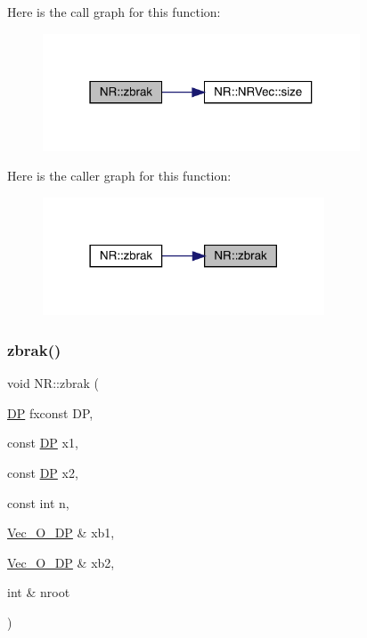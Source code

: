 Here is the call graph for this function\+:
\nopagebreak
\begin{figure}[H]
\begin{center}
\leavevmode
\includegraphics[width=267pt]{da/d46/namespaceNR_a83128554a5aed28c6d59ecb925577945_cgraph}
\end{center}
\end{figure}
Here is the caller graph for this function\+:
\nopagebreak
\begin{figure}[H]
\begin{center}
\leavevmode
\includegraphics[width=237pt]{da/d46/namespaceNR_a83128554a5aed28c6d59ecb925577945_icgraph}
\end{center}
\end{figure}
\mbox{\label{namespaceNR_ac611c5e25767065397e735aab1a07bf8}} 
\subsubsection{\texorpdfstring{zbrak()}{zbrak()}\hspace{0.1cm}{\footnotesize\ttfamily [2/2]}}
{\footnotesize\ttfamily void N\+R\+::zbrak (\begin{DoxyParamCaption}\item[{\mbox{\hyperlink{namespaceNR_af6ff762dd605ff477b8e52387253a02a}{DP}} }]{fxconst DP,  }\item[{const \mbox{\hyperlink{namespaceNR_af6ff762dd605ff477b8e52387253a02a}{DP}}}]{x1,  }\item[{const \mbox{\hyperlink{namespaceNR_af6ff762dd605ff477b8e52387253a02a}{DP}}}]{x2,  }\item[{const int}]{n,  }\item[{\mbox{\hyperlink{namespaceNR_a970094d23441f8ef6a45282a7eb2103d}{Vec\+\_\+\+O\+\_\+\+DP}} \&}]{xb1,  }\item[{\mbox{\hyperlink{namespaceNR_a970094d23441f8ef6a45282a7eb2103d}{Vec\+\_\+\+O\+\_\+\+DP}} \&}]{xb2,  }\item[{int \&}]{nroot }\end{DoxyParamCaption})}

